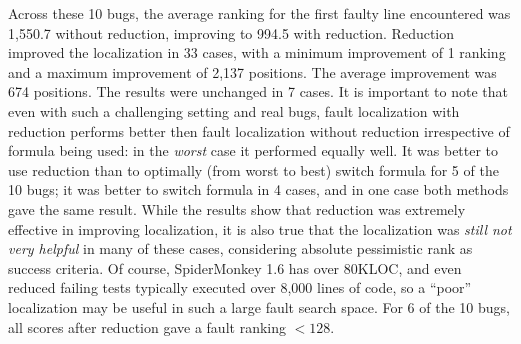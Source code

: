 Across these 10 bugs, the average ranking for the first faulty line
encountered was 1,550.7 without reduction, improving to 994.5 with
reduction.  Reduction improved the localization in 33 cases, with a
minimum improvement of 1 ranking and a maximum improvement of 2,137
positions.  The average improvement was 674 positions.  The results
were unchanged in 7 cases. It is important to note that even with such
a challenging setting and real bugs, fault localization with reduction
performs better then fault localization without reduction irrespective
of formula being used: in the \emph{worst} case it performed equally well. It was better to use reduction than to optimally (from worst to
best) switch formula for 5 of the 10 bugs; it was better to switch
formula in 4 cases, and in one case both methods gave the same result.
While the results show that reduction was extremely effective in
improving localization, it is also true that the localization was
\emph{still not very helpful} in many of these cases, considering absolute pessimistic rank as success criteria.  Of course,
SpiderMonkey 1.6 has over 80KLOC, and even reduced failing tests
typically executed over 8,000 lines of code, so a ``poor''
localization may be useful in such a large fault search space.  For 6
of the 10 bugs, all scores after reduction gave a fault ranking $< 128$.

